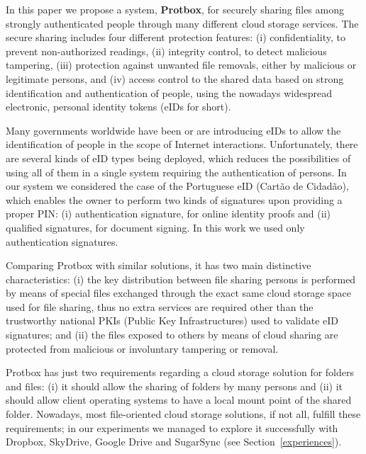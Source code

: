 \documentclass[english]{lni}
\newcommand\protbox{Protbox}
\begin{document}
In this paper we propose a system, \textbf{\protbox}, for securely
sharing files among strongly authenticated people through many different cloud
storage services. The secure sharing includes four different
protection features: (i) confidentiality, to prevent
non-authorized readings, (ii) integrity control, to detect malicious
tampering, (iii) protection against unwanted file removals,
either by malicious or legitimate persons, and (iv)
access control to the shared
data based on strong identification and authentication
of people, using the nowadays widespread electronic,
personal identity tokens (eIDs for short).

Many governments worldwide have been or are introducing eIDs to allow
the identification of people in the scope of Internet interactions.
Unfortunately, there are several kinds of eID types being deployed,
which reduces the possibilities of using all of them in a single
system requiring the authentication of persons. In our system we
considered the case of the Portuguese eID (Cartão de Cidadão), which
enables the owner to perform two kinds of signatures upon providing
a proper PIN: (i) authentication signature, for online identity
proofs and (ii) qualified signatures, for document signing. In this
work we used only authentication signatures.

Comparing {\protbox} with similar solutions, it has two main distinctive
characteristics: (i) the key distribution between file sharing
persons is performed by means of special files exchanged through the
exact same cloud storage space used for file sharing, thus no extra services
are required other than the trustworthy national PKIs (Public Key
Infrastructures) used to validate eID signatures; and (ii) the files
exposed to others by means of cloud sharing are protected from
malicious or involuntary tampering or removal.

{\protbox} has just two requirements regarding a cloud storage
solution for folders and files: (i) it should allow the sharing of  folders by many persons and (ii) it should allow client
operating systems to have a local mount point of the shared folder.
Nowadays, most file-oriented cloud storage solutions, if not all,
fulfill these requirements; in our experiments we managed to explore
it successfully with Dropbox, SkyDrive, Google Drive and SugarSync
(see Section~\ref{experiences}).
\end{document}
